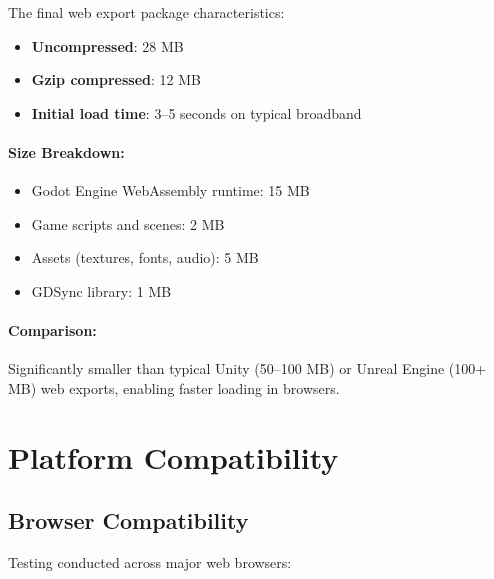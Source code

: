 The final web export package characteristics:

\begin{itemize}
    \item \textbf{Uncompressed}: 28 MB
    \item \textbf{Gzip compressed}: 12 MB
    \item \textbf{Initial load time}: 3--5 seconds on typical broadband
\end{itemize}

\paragraph*{Size Breakdown:}
\begin{itemize}
    \item Godot Engine WebAssembly runtime: 15 MB
    \item Game scripts and scenes: 2 MB
    \item Assets (textures, fonts, audio): 5 MB
    \item GDSync library: 1 MB
\end{itemize}

\paragraph*{Comparison:}

Significantly smaller than typical Unity (50--100 MB) or Unreal Engine (100+ MB) web exports, enabling faster loading in browsers.

\section{Platform Compatibility}
\label{sec:platform-compatibility}

\subsection{Browser Compatibility}
\label{subsec:browser-compatibility}

Testing conducted across major web browsers:


